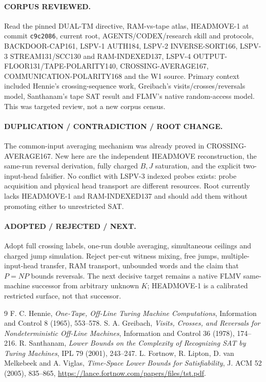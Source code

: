 \documentclass[11pt]{article}
\begin{document}
\paragraph{CORPUS REVIEWED.}
Read the pinned DUAL-TM directive, RAM-vs-tape atlas, HEADMOVE-1 at commit \texttt{c9c2086}, current root, AGENTS/CODEX/research skill and protocols, BACKDOOR-CAP161, LSPV-1 AUTH184, LSPV-2 INVERSE-SORT166, LSPV-3 STREAM131/SCC130 and RAM-INDEXED137, LSPV-4 OUTPUT-FLOOR131/TAPE-POLARITY140, CROSSING-AVERAGE167, COMMUNICATION-POLARITY168 and the W1 source. Primary context included Hennie's crossing-sequence work, Greibach's visits/crosses/reversals model, Santhanam's tape SAT result and FLMV's native random-access model. This was targeted review, not a new corpus census.

\paragraph{DUPLICATION / CONTRADICTION / ROOT CHANGE.}
The common-input averaging mechanism was already proved in CROSSING-AVERAGE167. New here are the independent HEADMOVE reconstruction, the same-run reversal derivation, fully charged \(B,J\) saturation, and the explicit two-input-head falsifier. No conflict with LSPV-3 indexed probes exists: probe acquisition and physical head transport are different resources. Root currently lacks HEADMOVE-1 and RAM-INDEXED137 and should add them without promoting either to unrestricted SAT.

\paragraph{ADOPTED / REJECTED / NEXT.}
Adopt full crossing labels, one-run double averaging, simultaneous ceilings and charged jump simulation. Reject per-cut witness mixing, free jumps, multiple-input-head transfer, RAM transport, unbounded words and the claim that \(P=NP\) bounds reversals. The next decisive target remains a native FLMV same-machine successor from arbitrary unknown \(K\); HEADMOVE-1 is a calibrated restricted surface, not that successor.

\begin{thebibliography}{9}\small
{} F. C. Hennie, \emph{One-Tape, Off-Line Turing Machine Computations}, Information and Control 8 (1965), 553--578.
 S. A. Greibach, \emph{Visits, Crosses, and Reversals for Nondeterministic Off-Line Machines}, Information and Control 36 (1978), 174--216.
 R. Santhanam, \emph{Lower Bounds on the Complexity of Recognizing SAT by Turing Machines}, IPL 79 (2001), 243--247.
 L. Fortnow, R. Lipton, D. van Melkebeek and A. Viglas, \emph{Time-Space Lower Bounds for Satisfiability}, J. ACM 52 (2005), 835--865, \url{https://lance.fortnow.com/papers/files/tst.pdf}.
\end{thebibliography}
\end{document}
